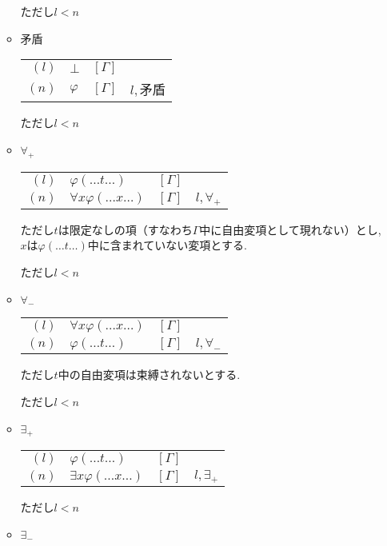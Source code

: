 \documentclass[10pt,b5paper,papersize,dvipdfmx]{jsbook}
\begin{document}
\begin{itemize}
\begin{itemize}
\begin{table}[H]
\begin{center}
\end{center}
\end{table}
ただし$l<n$
\item 矛盾
\begin{table}[H]
\begin{center}
\begin{tabular}{rlrl}
$(l)$&$\bot$&$[\Gamma]$& \\
$(n)$&$\varphi$&$[\Gamma]$&$l,$矛盾
\end{tabular}
\end{center}
\end{table}
ただし$l<n$
\item $\forall_+$
\begin{table}[H]
\begin{center}
\begin{tabular}{rlrl}
$(l)$&$\varphi(\dots t \dots)$&$[\Gamma]$& \\
$(n)$&$\forall x \varphi(\dots x \dots)$&$[\Gamma]$&$l,\forall_+$
\end{tabular}
\end{center}
\end{table}
ただし$t$は限定なしの項（すなわち$\Gamma$中に自由変項として現れない）とし,$x$は$\varphi(\dots t \dots)$中に含まれていない変項とする. \par
ただし$l<n$
\item $\forall_-$
\begin{table}[H]
\begin{center}
\begin{tabular}{rlrl}
$(l)$&$\forall x\varphi(\dots x \dots)$&$[\Gamma]$& \\
$(n)$&$\varphi(\dots t \dots)$&$[\Gamma]$&$l,\forall_-$
\end{tabular}
\end{center}
\end{table}
ただし$t$中の自由変項は束縛されないとする.\par
ただし$l<n$
\item $\exists_+$
\begin{table}[H]
\begin{center}
\begin{tabular}{rlrl}
$(l)$&$\varphi(\dots t \dots)$&$[\Gamma]$& \\
$(n)$&$\exists x\varphi(\dots x \dots)$&$[\Gamma]$&$l,\exists_+$
\end{tabular}
\end{center}
\end{table}
ただし$l<n$
\item $\exists_-$

\end{itemize}
\end{itemize}
\end{document}
